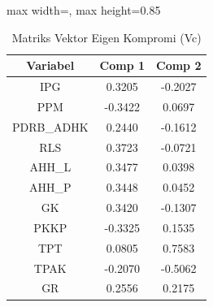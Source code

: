 \begin{table}[H]
\centering
\caption{Matriks Vektor Eigen Kompromi (Vc)} \label{tab:vc}
\begin{adjustbox}{max width=\textwidth, max height=0.85\textheight}
\begin{tabular}{|c|c|c|}
\hline
\textbf{Variabel} & \textbf{Comp 1} & \textbf{Comp 2} \\
\hline
IPG & 0.3205 & -0.2027 \\
PPM & -0.3422 & 0.0697 \\
PDRB\_ADHK & 0.2440 & -0.1612 \\
RLS & 0.3723 & -0.0721 \\
AHH\_L & 0.3477 & 0.0398 \\
AHH\_P & 0.3448 & 0.0452 \\
GK & 0.3420 & -0.1307 \\
PKKP & -0.3325 & 0.1535 \\
TPT & 0.0805 & 0.7583 \\
TPAK & -0.2070 & -0.5062 \\
GR & 0.2556 & 0.2175 \\
\hline
\end{tabular}
\end{adjustbox}
\end{table}